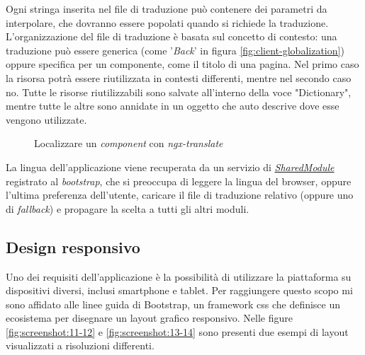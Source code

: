 \noindent
Ogni stringa inserita nel file di traduzione può contenere dei parametri da interpolare, che dovranno essere popolati quando si richiede la traduzione. L'organizzazione del file di traduzione è basata sul concetto di contesto: una traduzione può essere generica (come '\textit{Back}' in figura \ref{fig:client-globalization}) oppure specifica per un componente, come il titolo di una pagina. Nel primo caso la risorsa potrà essere riutilizzata in contesti differenti, mentre nel secondo caso no. Tutte le risorse riutilizzabili sono salvate all'interno della voce "Dictionary", mentre tutte le altre sono annidate in un oggetto che auto descrive dove esse vengono utilizzate.

 \begin{figure}[H] 
	\centering    
	
	\caption[Localizzare un \textit{component} con \textit{ngx-translate}]{Localizzare un \textit{component} con \textit{ngx-translate}}
	\label{fig:client-ngxtranslate}
\end{figure}

\noindent
La lingua dell'applicazione viene recuperata da un servizio di \hyperref[client:shared-module]{\textit{SharedModule}} registrato al \textit{bootstrap}, che si preoccupa di leggere la lingua del browser, oppure l'ultima preferenza dell'utente, caricare il file di traduzione relativo (oppure uno di \textit{fallback}) e propagare la scelta a tutti gli altri moduli.

\subsection{Design responsivo}

Uno dei requisiti dell'applicazione è la possibilità di utilizzare la piattaforma su dispositivi diversi, inclusi smartphone e tablet. Per raggiungere questo scopo mi sono affidato alle linee guida di Bootstrap, un \gls{framework} \acrshort{css} che definisce un ecosistema per disegnare un layout grafico responsivo. Nelle figure \ref{fig:screenshot:11-12} e \ref{fig:screenshot:13-14} sono presenti due esempi di layout visualizzati a risoluzioni differenti.

